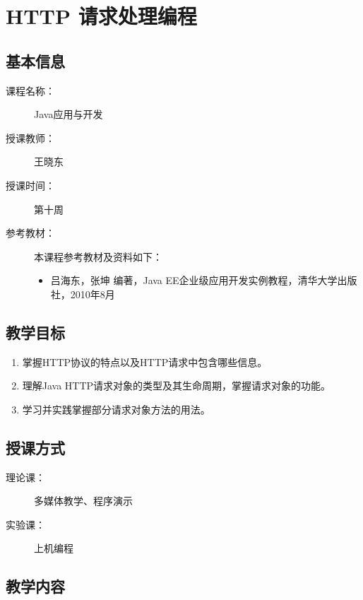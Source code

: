 \chapter{HTTP 请求处理编程}
\label{chp:JavaEE-HTTP-request-handling}

\section*{基本信息}
\sline
\begin{description}
\item[课程名称：] Java应用与开发
\item[授课教师：] 王晓东
\item[授课时间：] 第十周
\item[参考教材：] 本课程参考教材及资料如下：
  \begin{itemize}
  \item 吕海东，张坤 编著，Java EE企业级应用开发实例教程，清华大学出版社，2010年8月
  \end{itemize}
\end{description}

\section*{教学目标}

\sline

\begin{enumerate}
\item 掌握HTTP协议的特点以及HTTP请求中包含哪些信息。
\item 理解Java HTTP请求对象的类型及其生命周期，掌握请求对象的功能。
\item 学习并实践掌握部分请求对象方法的用法。
\end{enumerate}  

\section*{授课方式}

\sline
\begin{description}
\item[理论课：] 多媒体教学、程序演示
\item[实验课：] 上机编程
\end{description}

\newpage
\section*{教学内容}
\sline

